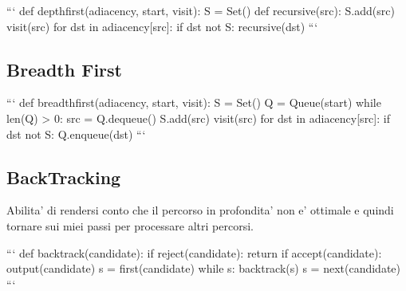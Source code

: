 ```
def depthfirst(adiacency, start, visit):
  S = Set({})
  def recursive(src):
    S.add(src)
    visit(src)
    for dst in adiacency[src]:
      if dst not S:
        recursive(dst)
```

\subsection{Breadth First}

```
def breadthfirst(adiacency, start, visit):
  S = Set({})
  Q = Queue({start})
  while len(Q) > 0:
    src = Q.dequeue()
    S.add(src)
    visit(src)
    for dst in adiacency[src]:
      if dst not S:
        Q.enqueue(dst)
```

\subsection{BackTracking}

Abilita' di rendersi conto che il percorso in profondita' non e' ottimale e quindi tornare sui miei passi per processare altri percorsi.

```
def backtrack(candidate):
  if reject(candidate):
    return
  if accept(candidate):
    output(candidate)
  s = first(candidate)
  while s:
    backtrack(s)
    s = next(candidate)
```
